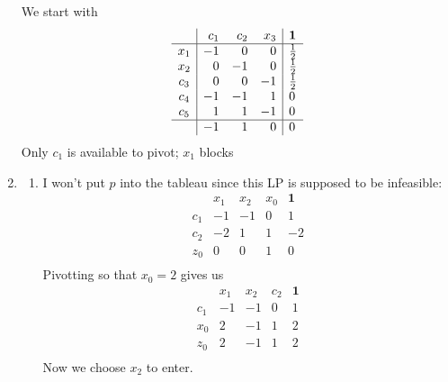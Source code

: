\documentclass[12pt]{article}
\begin{document}
\begin{enumerate}
            We start with
            \[\begin{array}{c|rrr|l}
                            & c_1 & c_2 & x_3 & \mathbf{1}  \\ \hline
                        x_1 & -1  & 0   & 0   & \frac{1}{2} \\
                        x_2 & 0   & -1  & 0   & \frac{1}{2} \\
                        c_3 & 0   & 0   & -1  & \frac{1}{2} \\
                        c_4 & -1  & -1  & 1   & 0           \\
                        c_5 & 1   & 1   & -1  & 0           \\ \hline
                            & -1  & 1   & 0   & 0           \\
                  \end{array}\]
            Only $c_1$ is available to pivot; $x_1$ blocks
      \item \begin{enumerate}
                  \item I won't put $p$ into the tableau since this LP is supposed to be infeasible:
                        \[\begin{array}{c|rrr|l}
                                        & x_1 & x_2 & x_0 & \mathbf{1} \\ \hline
                                    c_1 & -1  & -1  & 0   & 1          \\
                                    c_2 & -2  & 1   & 1   & -2         \\ \hline
                                    z_0 & 0   & 0   & 1   & 0          \\
                              \end{array}\]
                        Pivotting so that $x_0=2$ gives us
                        \[\begin{array}{c|rrr|l}
                                        & x_1 & x_2 & c_2 & \mathbf{1} \\ \hline
                                    c_1 & -1  & -1  & 0   & 1          \\
                                    x_0 & 2   & -1  & 1   & 2          \\ \hline
                                    z_0 & 2   & -1  & 1   & 2          \\
                              \end{array}\]
                        Now we choose $x_2$ to enter.

\end{enumerate}
\end{enumerate}
\end{document}
